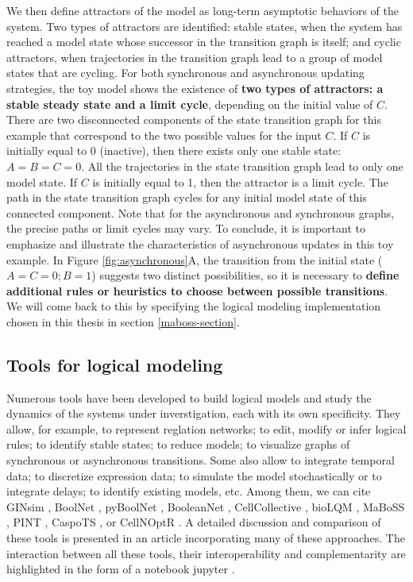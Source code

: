 \documentclass[a4paper,12pt,twoside,onecolumn,openright,final,oldfontcommands]{memoir}
\begin{document}
We then define attractors of the model as long-term asymptotic behaviors
of the system. Two types of attractors are identified: stable states,
when the system has reached a model state whose successor in the
transition graph is itself; and cyclic attractors, when trajectories in
the transition graph lead to a group of model states that are cycling.
For both synchronous and asynchronous updating strategies, the toy model
shows the existence of \textbf{two types of attractors: a stable steady
state and a limit cycle}, depending on the initial value of \(C\). There
are two disconnected components of the state transition graph for this
example that correspond to the two possible values for the input \(C\).
If \(C\) is initially equal to 0 (inactive), then there exists only one
stable state: \(A=B=C=0\). All the trajectories in the state transition
graph lead to only one model state. If \(C\) is initially equal to 1,
then the attractor is a limit cycle. The path in the state transition
graph cycles for any initial model state of this connected component.
Note that for the asynchronous and synchronous graphs, the precise paths
or limit cycles may vary. To conclude, it is important to emphasize and
illustrate the characteristics of asynchronous updates in this toy
example. In Figure \ref{fig:asynchronous}A, the transition from the
initial state (\(A=C=0;B=1\)) suggests two distinct possibilities, so it
is necessary to \textbf{define additional rules or heuristics to choose
between possible transitions}. We will come back to this by specifying
the logical modeling implementation chosen in this thesis in section
\ref{maboss-section}.

\subsection{Tools for logical
modeling}\label{tools-for-logical-modeling}

Numerous tools have been developed to build logical models and study the
dynamics of the systems under inverstigation, each with its own
specificity. They allow, for example, to represent reglation networks;
to edit, modify or infer logical rules; to identify stable states; to
reduce models; to visualize graphs of synchronous or asynchronous
transitions. Some also allow to integrate temporal data; to discretize
expression data; to simulate the model stochastically or to integrate
delays; to identify existing models, etc. Among them, we can cite GINsim
\citep{naldi2018logical}, BoolNet \citep{mussel2010boolnet}, pyBoolNet
\citep{klarner2016pyboolnet}, BooleanNet \citep{albert2008boolean},
CellCollective \citep{helikar2012cell}, bioLQM \citep{naldi2018biolqm},
MaBoSS \citep{stoll2012continuous, stoll2017maboss}, PINT \citep{Pint},
CaspoTS \citep{ostrowskiboolean2016}, or CellNOptR
\citep{terfvecellnoptr2012}. A detailed discussion and comparison of
these tools is presented in an article incorporating many of these
approaches. The interaction between all these tools, their
interoperability and complementarity are highlighted in the form of a
notebook jupyter \citep{naldi2018colomoto}.
\end{document}
